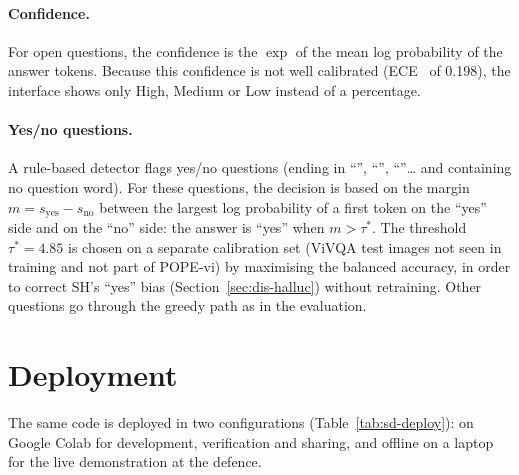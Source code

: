 \paragraph{Confidence.} For open questions, the confidence is the $\exp$ of the mean log
probability of the answer tokens. Because this confidence is not well calibrated
(ECE~\cite{guo2017calibration} of 0.198), the interface shows only High, Medium or Low
instead of a percentage.

\paragraph{Yes/no questions.} A rule-based detector flags yes/no questions (ending in
``'', ``'', ``''\ldots{} and containing no question
word). For these questions, the decision is based on the margin
$m = s_{\text{yes}} - s_{\text{no}}$ between the largest log probability of a first token
on the ``yes'' side and on the ``no'' side: the answer is ``yes'' when $m > \tau^*$. The
threshold $\tau^* = 4.85$ is chosen on a separate calibration set (ViVQA test images not
seen in training and not part of POPE-vi) by maximising the balanced accuracy, in order to
correct SH's ``yes'' bias (Section~\ref{sec:dis-halluc}) without retraining. Other
questions go through the greedy path as in the evaluation.

\section{Deployment}
\label{sec:sd-deploy}

The same code is deployed in two configurations (Table~\ref{tab:sd-deploy}): on Google Colab
for development, verification and sharing, and offline on a laptop for the live
demonstration at the defence.

